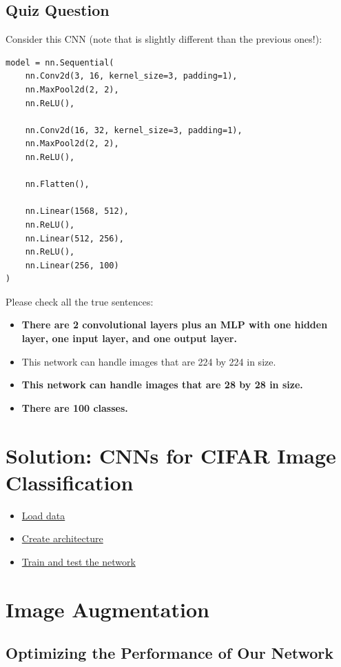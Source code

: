 \subsection{Quiz Question}

Consider this CNN (note that is slightly different than the previous ones!):
\begin{lstlisting}
model = nn.Sequential(
    nn.Conv2d(3, 16, kernel_size=3, padding=1), 
    nn.MaxPool2d(2, 2),
    nn.ReLU(),
    
    nn.Conv2d(16, 32, kernel_size=3, padding=1),
    nn.MaxPool2d(2, 2),
    nn.ReLU(),
    
    nn.Flatten(),
    
    nn.Linear(1568, 512),
    nn.ReLU(),
    nn.Linear(512, 256),
    nn.ReLU(),
    nn.Linear(256, 100)
)
\end{lstlisting}
Please check all the true sentences:
\begin{itemize}
    \item \textbf{There are 2 convolutional layers plus an MLP with one hidden layer, one input layer, and one output layer.}
    \item This network can handle images that are 224 by 224 in size.
    \item \textbf{This network can handle images that are 28 by 28 in size.}
    \item \textbf{There are 100 classes.}
\end{itemize}

\section{Solution: CNNs for CIFAR Image Classification}
\begin{itemize}
    \item \href{https://www.youtube.com/watch?v=N6XMFPmXysk&t=1s&ab_channel=Udacity}{Load data}
    \item \href{https://www.youtube.com/watch?v=4XaDhzZsx9c&t=70s&ab_channel=Udacity}{Create architecture}
    \item \href{https://www.youtube.com/watch?v=Aw0D_u5-7wc&ab_channel=Udacity}{Train and test the network}
\end{itemize}

\section{Image Augmentation}

\subsection{Optimizing the Performance of Our Network}

